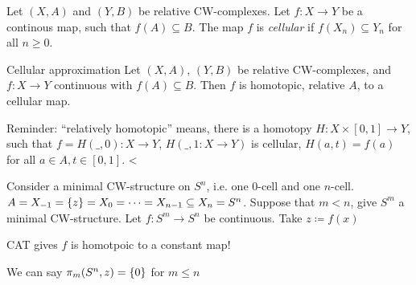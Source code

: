 \documentclass{TemplateLecture}
\begin{document}
    \begin{defi}{}{}
        Let \((X,A)\) and \((Y,B)\) be relative CW-complexes. Let \(f \colon X\to Y\) be a continous map, such that \(f(A) \subseteq B\). The map \(f\) is \emph{cellular} if  \(f(X_n) \subseteq Y_n\) for all \(n \geq 0\).
    \end{defi}

    \begin{thm}{Cellular approximation}{}
        Let \((X,A)\), \((Y,B)\) be relative CW-complexes, and \(f\colon X \to Y\) continuous with \(f(A) \subseteq B\). Then \(f\) is homotopic, relative \(A\), to a cellular map.
    \end{thm}

    Reminder: \enquote{relatively homotopic} means, there is a homotopy \(H\colon X\times [0,1] \to Y\), such that \(f = H(\_, 0) \colon X \to Y\), \(H(\_, 1\colon X \to Y)\) is cellular, \(H(a,t) = f(a)\) for all \(a \in A, t \in [0,1]\).
<
\begin{example}
    Consider a minimal CW-structure on \(S^n\), i.e. one \(0\)-cell and one \(n\)-cell.
    \(A = X_{-1} = \{z\} = X_0 = \dots = X_{n-1} \subseteq X_n = S^n\).
    Suppose that \(m < n\), give \(S^m\) a minimal CW-structure. Let \(f\colon S^m \to S^n\) be continuous. Take \(z \coloneq f(x)\)

    CAT gives \(f\) is homotpoic to a constant map! %

    We can say \(\pi_m(S^n, z) = \{0\}\) for \(m \leq n\)
\end{example}
\end{document}
